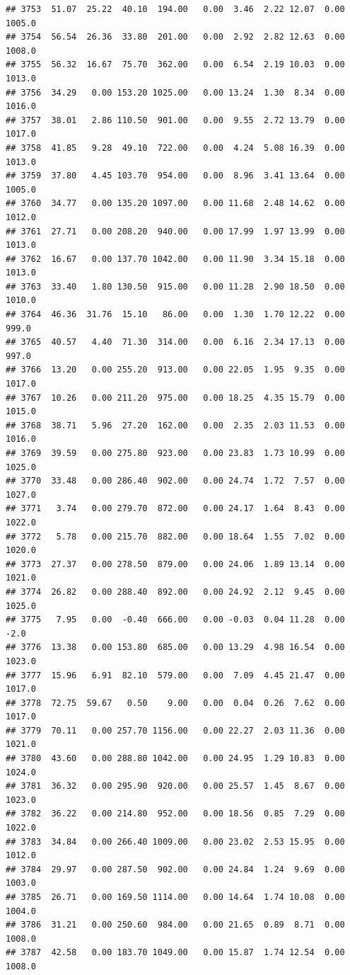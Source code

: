\documentclass{article}\usepackage{graphicx, color}
\makeatletter
\newenvironment{kframe}{%
 \def\at@end@of@kframe{}%
 \ifinner\ifhmode%
  \def\at@end@of@kframe{\end{minipage}}%
  \begin{minipage}{\columnwidth}%
 \fi\fi%
 \def\FrameCommand##1{\hskip\@totalleftmargin \hskip-\fboxsep
 \colorbox{shadecolor}{##1}\hskip-\fboxsep
     \hskip-\linewidth \hskip-\@totalleftmargin \hskip\columnwidth}%
 \MakeFramed {\advance\hsize-\width
   \@totalleftmargin\z@ \linewidth\hsize
   \@setminipage}}%
 {\par\unskip\endMakeFramed%
 \at@end@of@kframe}
\newenvironment{knitrout}{}{} %
\makeatother
\begin{document}
\begin{knitrout}
\begin{kframe}
\begin{verbatim}
## 3753  51.07  25.22  40.10  194.00   0.00  3.46  2.22 12.07  0.00 1005.0
## 3754  56.54  26.36  33.80  201.00   0.00  2.92  2.82 12.63  0.00 1008.0
## 3755  56.32  16.67  75.70  362.00   0.00  6.54  2.19 10.03  0.00 1013.0
## 3756  34.29   0.00 153.20 1025.00   0.00 13.24  1.30  8.34  0.00 1016.0
## 3757  38.01   2.86 110.50  901.00   0.00  9.55  2.72 13.79  0.00 1017.0
## 3758  41.85   9.28  49.10  722.00   0.00  4.24  5.08 16.39  0.00 1013.0
## 3759  37.80   4.45 103.70  954.00   0.00  8.96  3.41 13.64  0.00 1005.0
## 3760  34.77   0.00 135.20 1097.00   0.00 11.68  2.48 14.62  0.00 1012.0
## 3761  27.71   0.00 208.20  940.00   0.00 17.99  1.97 13.99  0.00 1013.0
## 3762  16.67   0.00 137.70 1042.00   0.00 11.90  3.34 15.18  0.00 1013.0
## 3763  33.40   1.80 130.50  915.00   0.00 11.28  2.90 18.50  0.00 1010.0
## 3764  46.36  31.76  15.10   86.00   0.00  1.30  1.70 12.22  0.00  999.0
## 3765  40.57   4.40  71.30  314.00   0.00  6.16  2.34 17.13  0.00  997.0
## 3766  13.20   0.00 255.20  913.00   0.00 22.05  1.95  9.35  0.00 1017.0
## 3767  10.26   0.00 211.20  975.00   0.00 18.25  4.35 15.79  0.00 1015.0
## 3768  38.71   5.96  27.20  162.00   0.00  2.35  2.03 11.53  0.00 1016.0
## 3769  39.59   0.00 275.80  923.00   0.00 23.83  1.73 10.99  0.00 1025.0
## 3770  33.48   0.00 286.40  902.00   0.00 24.74  1.72  7.57  0.00 1027.0
## 3771   3.74   0.00 279.70  872.00   0.00 24.17  1.64  8.43  0.00 1022.0
## 3772   5.78   0.00 215.70  882.00   0.00 18.64  1.55  7.02  0.00 1020.0
## 3773  27.37   0.00 278.50  879.00   0.00 24.06  1.89 13.14  0.00 1021.0
## 3774  26.82   0.00 288.40  892.00   0.00 24.92  2.12  9.45  0.00 1025.0
## 3775   7.95   0.00  -0.40  666.00   0.00 -0.03  0.04 11.28  0.00   -2.0
## 3776  13.38   0.00 153.80  685.00   0.00 13.29  4.98 16.54  0.00 1023.0
## 3777  15.96   6.91  82.10  579.00   0.00  7.09  4.45 21.47  0.00 1017.0
## 3778  72.75  59.67   0.50    9.00   0.00  0.04  0.26  7.62  0.00 1017.0
## 3779  70.11   0.00 257.70 1156.00   0.00 22.27  2.03 11.36  0.00 1021.0
## 3780  43.60   0.00 288.80 1042.00   0.00 24.95  1.29 10.83  0.00 1024.0
## 3781  36.32   0.00 295.90  920.00   0.00 25.57  1.45  8.67  0.00 1023.0
## 3782  36.22   0.00 214.80  952.00   0.00 18.56  0.85  7.29  0.00 1022.0
## 3783  34.84   0.00 266.40 1009.00   0.00 23.02  2.53 15.95  0.00 1012.0
## 3784  29.97   0.00 287.50  902.00   0.00 24.84  1.24  9.69  0.00 1003.0
## 3785  26.71   0.00 169.50 1114.00   0.00 14.64  1.74 10.08  0.00 1004.0
## 3786  31.21   0.00 250.60  984.00   0.00 21.65  0.89  8.71  0.00 1008.0
## 3787  42.58   0.00 183.70 1049.00   0.00 15.87  1.74 12.54  0.00 1008.0

\end{verbatim}
\end{kframe}
\end{knitrout}
\end{document}

